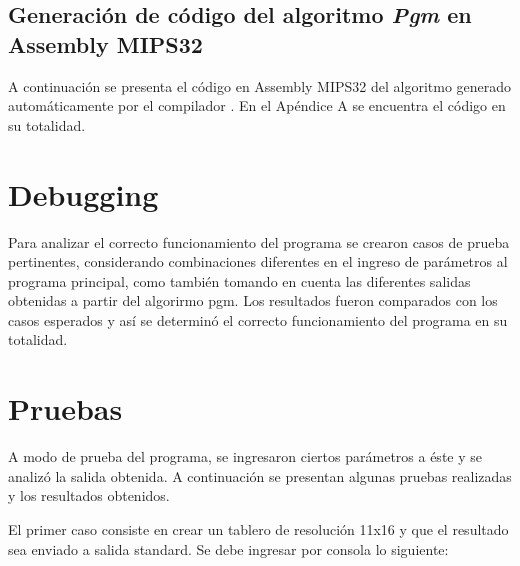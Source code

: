 \documentclass{article}
\begin{document}
%  



\newpage
\subsection{Generación de código del algoritmo \textit{Pgm} en Assembly MIPS32}

	A continuación se presenta el código en Assembly MIPS32 del algoritmo  generado automáticamente por el compilador . En el Apéndice A se encuentra el código en su totalidad.
	\medskip

%  


%  


\section{Debugging}
	
	Para analizar el correcto funcionamiento del programa se crearon casos de prueba pertinentes, considerando combinaciones diferentes en el ingreso de parámetros al programa principal, como también tomando en cuenta las diferentes salidas obtenidas a partir del algorirmo pgm. Los resultados fueron comparados con los casos esperados y así se determinó el correcto funcionamiento del programa en su totalidad.
\bigskip




\section{Pruebas}

	A modo de prueba del programa, se ingresaron ciertos parámetros a éste y se analizó la salida obtenida. A continuación se presentan algunas pruebas realizadas y los resultados obtenidos.
	\par
	El primer caso consiste en crear un tablero de resolución 11x16 y que el resultado sea enviado a salida standard. Se debe ingresar por consola lo siguiente:
	\smallskip
\end{document}

